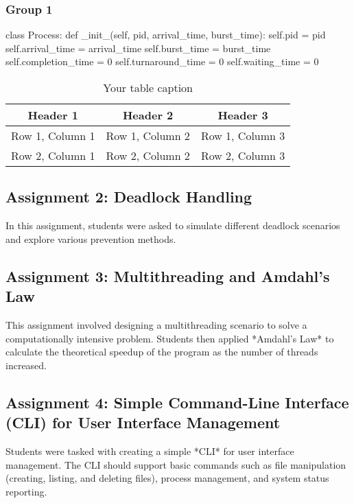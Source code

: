 \documentclass[12pt]{article}
\begin{document}
\subsubsection{Group 1}
\begin{python}
    class Process:
    def _init_(self, pid, arrival_time, burst_time):
    self.pid = pid
    self.arrival_time = arrival_time
    self.burst_time = burst_time
    self.completion_time = 0
    self.turnaround_time = 0
    self.waiting_time = 0
\end{python}

\begin{table}[htbp] %
    \centering
    \begin{tabular}{|c|c|c|} %
        \hline
        Header 1        & Header 2        & Header 3        \\ %
        \hline
        Row 1, Column 1 & Row 1, Column 2 & Row 1, Column 3 \\ %
        \hline
        Row 2, Column 1 & Row 2, Column 2 & Row 2, Column 3 \\ %
        \hline
    \end{tabular}
    \caption{Your table caption} %
    \label{tab:your_label} %
\end{table}

\subsection{Assignment 2: Deadlock Handling}
In this assignment, students were asked to simulate different deadlock
scenarios and explore various prevention methods.

\subsection{Assignment 3: Multithreading and Amdahl's Law}
This assignment involved designing a multithreading scenario to solve a
computationally intensive problem. Students then applied *Amdahl's Law* to
calculate the theoretical speedup of the program as the number of threads
increased.

\subsection{Assignment 4: Simple Command-Line Interface (CLI) for User Interface Management}
Students were tasked with creating a simple *CLI* for user interface
management. The CLI should support basic commands such as file manipulation
(creating, listing, and deleting files), process management, and system status
reporting.
\end{document}
